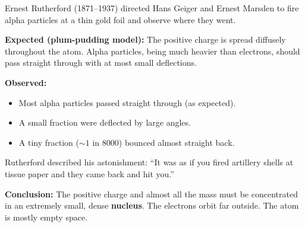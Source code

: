\begin{historybox}
Ernest Rutherford (1871--1937) directed Hans Geiger
and Ernest Marsden to fire alpha particles at a thin
gold foil and observe where they went.

\textbf{Expected (plum-pudding model):} The positive
charge is spread diffusely throughout the atom. Alpha
particles, being much heavier than electrons, should
pass straight through with at most small deflections.

\textbf{Observed:}
\begin{itemize}[noitemsep]
  \item Most alpha particles passed straight through
  (as expected).
  \item A small fraction were deflected by large angles.
  \item A tiny fraction ($\sim 1$ in $8000$) bounced
  almost straight back.
\end{itemize}

Rutherford described his astonishment: ``It was as if
you fired artillery shells at tissue paper and they
came back and hit you.''

\textbf{Conclusion:} The positive charge and almost
all the mass must be concentrated in an extremely
small, dense \textbf{nucleus}. The electrons orbit
far outside. The atom is mostly empty space.
\end{historybox}

